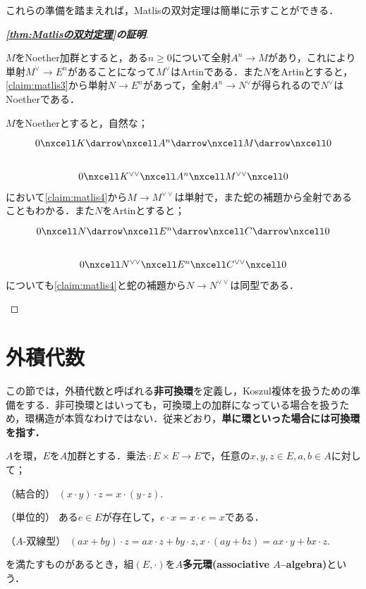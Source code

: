 これらの準備を踏まえれば，Matlisの双対定理は簡単に示すことができる．
\begin{proof}[\textbf{\ref{thm:Matlisの双対定理}の証明}]
	\begin{sakura}
		\item $M$をNoether加群とすると，ある$n\geq0$について全射$A^n\to M$があり，これにより単射$M^\vee\to E^n$があることになって$M^\vee$はArtinである．また$N$をArtinとすると，\ref{claim:matlis3}から単射$N\to E^n$があって，全射$A^n\to N^\vee$が得られるので$N^\vee$はNoetherである．
		\item $M$をNoetherとすると，自然な；
		\[\begin{tikzcd}
			0\nxcell K\darrow\nxcell A^n\darrow\nxcell M\darrow\nxcell0\\
			0\nxcell K^{\vee\vee}\nxcell A^n\nxcell M^{\vee\vee}\nxcell0
		\end{tikzcd}\]
		において\ref{claim:matlis4}から$M\to M^{\vee\vee}$は単射で，また蛇の補題から全射であることもわかる．また$N$をArtinとすると；
		\[\begin{tikzcd}
			0\nxcell N\darrow\nxcell E^n\darrow\nxcell C\darrow\nxcell0\\
			0\nxcell N^{\vee\vee}\nxcell E^n\nxcell C^{\vee\vee}\nxcell0
		\end{tikzcd}\]
		についても\ref{claim:matlis4}と蛇の補題から$N\to N^{\vee\vee}$は同型である．
	\end{sakura}
\end{proof}

\section{外積代数}

この節では，外積代数と呼ばれる\textbf{非可換環}を定義し，Koszul複体を扱うための準備をする．非可換環とはいっても，可換環上の加群になっている場合を扱うため，環構造が本質なわけではない．従来どおり，\textbf{単に環といった場合には可換環を指す．}

\begin{defi}[多元環]
	$A$を環，$E$を$A$加群とする．乗法$\cdot: E\times E\to E$で，任意の$x,y,z\in E,a,b\in A$に対して；
	\begin{sakura}
		\item （結合的） $(x\cdot y)\cdot z=x\cdot (y\cdot z).$
		\item （単位的） ある$e\in E$が存在して，$e\cdot x=x\cdot e=x$である．
		\item （$A$-双線型） $(ax+by)\cdot z=ax\cdot z+by\cdot z, x\cdot(ay+bz)=ax\cdot y+bx\cdot z.$
	\end{sakura}
	を満たすものがあるとき，組$(E,\cdot)$を\textbf{$A$多元環(associative $A$--algebra)}という．
\end{defi}


